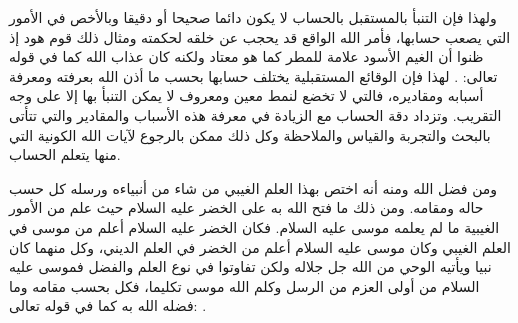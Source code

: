 ولهذا فإن التنبأ بالمستقبل بالحساب لا يكون دائما صحيحا 
أو دقيقا وبالأخص في الأمور التي يصعب حسابها، فأمر الله الواقع قد يحجب عن خلقه لحكمته ومثال ذلك قوم هود إذ ظنوا أن الغيم الأسود علامة للمطر كما هو معتاد ولكنه كان عذاب الله كما في قوله تعالى: 
\quranayah*[46][24-25]{\footnotesize \surahname*[46]}. لهذا فإن الوقائع المستقبلية يختلف حسابها بحسب ما أذن الله بعرفته ومعرفة أسبابه ومقاديره، فالتي لا تخضع لنمط معين ومعروف لا يمكن التنبأ بها إلا على وجه التقريب. وتزداد دقة الحساب مع الزيادة في معرفة هذه الأسباب والمقادير والتي تتأتى بالبحث والتجربة والقياس والملاحظة وكل ذلك ممكن بالرجوع لآيات الله الكونية التي منها يتعلم الحساب. 

ومن فضل الله ومنه أنه اختص بهذا العلم الغيبي من شاء من أنبياءه ورسله كل حسب حاله ومقامه. ومن ذلك ما فتح الله به على الخضر عليه السلام حيث علم من الأمور الغيبية ما لم يعلمه موسى عليه السلام. فكان الخضر عليه السلام أعلم من موسى في العلم الغيبي وكان موسى عليه السلام أعلم من الخضر في العلم الديني، وكل منهما كان نبيا ويأتيه الوحي من الله جل جلاله ولكن تفاوتوا في نوع العلم والفضل فموسى عليه السلام من أولى العزم من الرسل وكلم الله موسى تكليما، فكل بحسب مقامه وما فضله الله به كما في قوله تعالى:
\quranayah*[2][253][1-21]{\footnotesize \surahname*[2]}.

